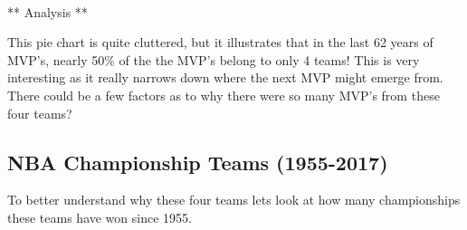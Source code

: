 \documentclass[11pt]{article}
\begin{document}
    \begin{center}
    \end{center}
    { \hspace*{\fill} \\}
    
    ** Analysis **

This pie chart is quite cluttered, but it illustrates that in the last
62 years of MVP's, nearly 50\% of the the MVP's belong to only 4 teams!
This is very interesting as it really narrows down where the next MVP
might emerge from. There could be a few factors as to why there were so
many MVP's from these four teams?

\subsection{NBA Championship Teams
(1955-2017)}\label{nba-championship-teams-1955-2017}

To better understand why these four teams lets look at how many
championships these teams have won since 1955.
\end{document}
